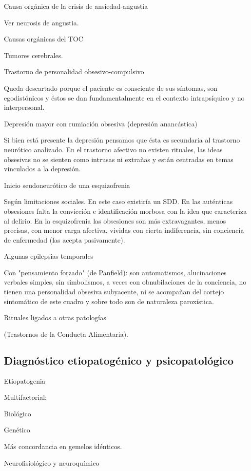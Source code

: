 Causa orgánica de la crisis de ansiedad-angustia

Ver neurosis de angustia.

Causas orgánicas del TOC

Tumores cerebrales.

Trastorno de personalidad obsesivo-compulsivo

Queda descartado porque el paciente es consciente de sus síntomas, son egodistónicos y éstos se dan fundamentalmente en el contexto intrapsíquico y no interpersonal.

Depresión mayor con rumiación obsesiva (depresión anancástica)

Si bien está presente la depresión pensamos que ésta es secundaria al trastorno neurótico analizado. En el trastorno afectivo no existen rituales, las ideas obsesivas no se sienten como intrusas ni extrañas y están centradas en temas vinculados a la depresión.

Inicio seudoneurótico de una esquizofrenia

Según limitaciones sociales. En este caso existiría un SDD. En las auténticas obsesiones falta la convicción e identificación morbosa con la idea que caracteriza al delirio. En la esquizofrenia las obsesiones son más extravagantes, menos precisas, con menor carga afectiva, vividas con cierta indiferencia, sin conciencia de enfermedad (las acepta pasivamente).

Algunas epilepsias temporales

Con "pensamiento forzado" (de Panfield): son automatismos, alucinaciones verbales simples, sin simbolismos, a veces con obnubilaciones de la conciencia, no tienen una personalidad obsesiva subyacente, ni se acompañan del cortejo sintomático de este cuadro y sobre todo son de naturaleza paroxística.

Rituales ligados a otras patologías

(Trastornos de la Conducta Alimentaria).

\subsection*{Diagnóstico etiopatogénico y psicopatológico}

Etiopatogenia

Multifactorial:

Biológico

Genético

Más concordancia en gemelos idénticos.

Neurofisiológico y neuroquímico

